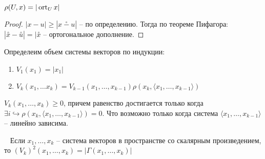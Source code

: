 \begin{proposition}
    $\rho (U, x) = |\operatorname{ort}_U x|$
\end{proposition}

\begin{proof}
    $|x - u| \geq |\stackrel{\circ}{x - u}|$ -- по определению. Тогда по теореме Пифагора: $|\stackrel{\circ}{x} - \stackrel{\circ}{u}| = |\stackrel{\circ}{x}$ -- ортогональное дополнение.
\end{proof}

\begin{definition}
    Определеим объем системы векторов по индукции:
    \begin{enumerate}
        \item $V_1(x_1) = |x_1|$
        \item $V_k(x_1, \dots x_k) = V_{k -1} (x_1, \dots, x_{k - 1}) \rho(x_k, \langle x_1, \dots, x_{k - 1} \rangle)$
    \end{enumerate}
\end{definition}

\begin{corollary}
    $V_k(x_1, \dots, x_k) \geq 0$, причем равенство достигается только когда $\exists i \hookrightarrow \rho(x_k, \langle x_1, \dots, x_{k - 1} \rangle) = 0$. Что возможно только когда система $\langle x_1, \dots, x_{k - 1} \rangle$ -- линейно зависима.
\end{corollary}

\begin{theorem}~
    Если $x_1, \dots, x_k$ -- система векторов в пространстве со скалярным произведением, то $(V_k)^2(x_1, \dots, x_k) = |\Gamma(x_1, \dots, x_k)|$
\end{theorem}

